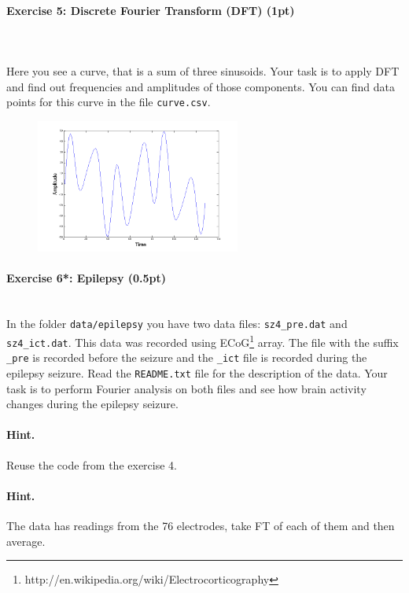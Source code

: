 \documentclass[a4paper,11pt]{article}
\newenvironment{exercise}[3]{\paragraph{Exercise #1: #2 (#3pt)}\ \\}{
\medskip}
\begin{document}
\begin{exercise}{5}{Discrete Fourier Transform (DFT)}{1}
\ \\
Here you see a curve, that is a sum of three sinusoids. Your task is to apply DFT and find out frequencies and amplitudes of those components. You can find data points for this curve in the file \texttt{curve.csv}.
\begin{figure}[htbp]
   \centering
   \includegraphics[width=0.6\textwidth]{dodft.png} 
\end{figure}
\end{exercise}


%
%
\begin{exercise}{6*}{Epilepsy}{0.5}
In the folder \texttt{data/epilepsy} you have two data files: \texttt{sz4\_pre.dat} and \texttt{sz4\_ict.dat}. This data was recorded using ECoG\footnote{http://en.wikipedia.org/wiki/Electrocorticography} array. The file with the suffix \texttt{\_pre} is recorded before the seizure and the \texttt{\_ict} file is recorded during the epilepsy seizure. Read the \texttt{README.txt} file for the description of the data. Your task is to perform Fourier analysis on both files and see how brain activity changes during the epilepsy seizure.
\paragraph{Hint.} Reuse the code from the exercise 4.
\paragraph{Hint.} The data has readings from the 76 electrodes, take FT of each of them and then average.
\end{exercise}
\end{document}
